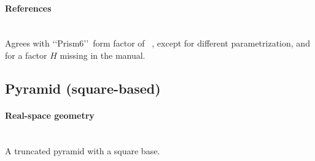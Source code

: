 \paragraph{References}\strut\\
Agrees with \lq\lq Prism6\rq\rq\ form factor of \IsGISAXS~\cite{Laz02},
except for different parametrization,
and for a factor $H$ missing in the  manual. 

\clearpage
\subsection{Pyramid (square-based)}\label{sec:Pyramid}

\paragraph{Real-space geometry}\strut\\
A truncated pyramid with a square base.

\begin{figure}[h]
\hfill
{}
\hfill
{}
\hfill
\end{figure}

\FloatBarrier

